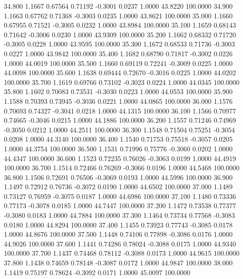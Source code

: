   34.800   1.1667   0.67564   0.71192  -0.3001   0.0237   1.0000  43.8220 100.0000
  34.900   1.1663   0.67762   0.71368  -0.3003   0.0235   1.0000  43.8621 100.0000
  35.000   1.1660   0.67955   0.71521  -0.3005   0.0232   1.0000  43.8984 100.0000
  35.100   1.1659   0.68143   0.71642  -0.3006   0.0230   1.0000  43.9309 100.0000
  35.200   1.1662   0.68332   0.71720  -0.3005   0.0228   1.0000  43.9595 100.0000
  35.300   1.1672   0.68533   0.71736  -0.3003   0.0227   1.0000  43.9842 100.0000
  35.400   1.1682   0.68790   0.71817  -0.3002   0.0226   1.0000  44.0019 100.0000
  35.500   1.1660   0.69119   0.72241  -0.3009   0.0225   1.0000  44.0098 100.0000
  35.600   1.1638   0.69444   0.72670  -0.3016   0.0225   1.0000  44.0202 100.0000
  35.700   1.1619   0.69766   0.73102  -0.3023   0.0224   1.0000  44.0345 100.0000
  35.800   1.1602   0.70083   0.73531  -0.3030   0.0223   1.0000  44.0553 100.0000
  35.900   1.1588   0.70393   0.73945  -0.3036   0.0221   1.0000  44.0865 100.0000
  36.000   1.1576   0.70693   0.74327  -0.3041   0.0218   1.0000  44.1315 100.0000
  36.100   1.1566   0.70977   0.74665  -0.3046   0.0215   1.0000  44.1886 100.0000
  36.200   1.1557   0.71246   0.74969  -0.3050   0.0212   1.0000  44.2511 100.0000
  36.300   1.1548   0.71504   0.75251  -0.3054   0.0208   1.0000  44.3140 100.0000
  36.400   1.1540   0.71753   0.75518  -0.3057   0.0205   1.0000  44.3754 100.0000
  36.500   1.1531   0.71996   0.75776  -0.3060   0.0202   1.0000  44.4347 100.0000
  36.600   1.1523   0.72235   0.76026  -0.3063   0.0199   1.0000  44.4919 100.0000
  36.700   1.1514   0.72466   0.76269  -0.3066   0.0196   1.0000  44.5468 100.0000
  36.800   1.1506   0.72691   0.76506  -0.3069   0.0193   1.0000  44.5996 100.0000
  36.900   1.1497   0.72912   0.76736  -0.3072   0.0190   1.0000  44.6502 100.0000
  37.000   1.1489   0.73127   0.76959  -0.3075   0.0187   1.0000  44.6986 100.0000
  37.100   1.1480   0.73336   0.77173  -0.3078   0.0185   1.0000  44.7447 100.0000
  37.200   1.1472   0.73538   0.77377  -0.3080   0.0183   1.0000  44.7884 100.0000
  37.300   1.1464   0.73734   0.77568  -0.3083   0.0180   1.0000  44.8294 100.0000
  37.400   1.1455   0.73923   0.77743  -0.3085   0.0178   1.0000  44.8676 100.0000
  37.500   1.1448   0.74106   0.77898  -0.3086   0.0176   1.0000  44.9026 100.0000
  37.600   1.1441   0.74286   0.78024  -0.3088   0.0175   1.0000  44.9340 100.0000
  37.700   1.1437   0.74468   0.78112  -0.3088   0.0173   1.0000  44.9615 100.0000
  37.800   1.1438   0.74659   0.78148  -0.3087   0.0172   1.0000  44.9847 100.0000
  38.000   1.1419   0.75197   0.78624  -0.3092   0.0171   1.0000  45.0097 100.0000
